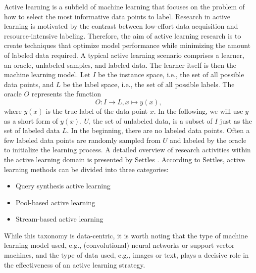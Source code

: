 Active learning is a subfield of machine learning that focuses on the problem of how to select the most informative data points to label.
Research in active learning is motivated by the contrast between low-effort data acquisition and resource-intensive labeling.
Therefore, the aim of active learning research is to create techniques that optimize model performance while minimizing the amount of
labeled data required. A typical active learning scenario comprises a learner, an oracle, unlabeled samples, and labeled data. The learner
itself is then the machine learning model. Let $I$ be the instance space, i.e., the set of all possible data points, and $L$ be the label
space, i.e., the set of all possible labels. The oracle $O$ represents the function
\begin{equation}
    O: I \rightarrow L, x \mapsto y(x),
\end{equation}
where $y(x)$ is the true label of the data point $x$. In the following, we will use $y$ as a short form of $y(x)$. $U$, the set of unlabeled data,
is a subset of $I$ just as the set of labeled data $L$. In the beginning, there are no labeled data points. Often a few labeled data points
are randomly sampled from $U$ and labeled by the oracle to initialize the learning process. A detailed overview of research activities within
the active learning domain is presented by Settles \cite{settles2009active}. According to Settles, active learning methods can be divided into three categories:
\begin{itemize}
    \item Query synthesis active learning
    \item Pool-based active learning
    \item Stream-based active learning
\end{itemize}
While this taxonomy is data-centric, it is worth noting that the type of machine learning model used, e.g., (convolutional) neural networks or support vector machines,
and the type of data used, e.g., images or text, plays a decisive role in the
effectiveness of an active learning strategy.


